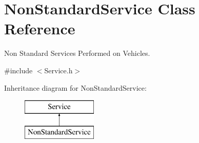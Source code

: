 \hypertarget{class_non_standard_service}{}\section{Non\+Standard\+Service Class Reference}
\label{class_non_standard_service}


Non Standard Services Performed on Vehicles.  




{\ttfamily \#include $<$Service.\+h$>$}

Inheritance diagram for Non\+Standard\+Service\+:\begin{figure}[H]
\begin{center}
\leavevmode
\includegraphics[height=2.000000cm]{class_non_standard_service}
\end{center}
\end{figure}
